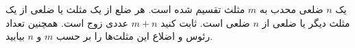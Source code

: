 \EXERCISE
یک 
$n$
ضلعی محدب به
$m$
مثلث تقسیم شده است. هر ضلع از یک مثلث یا ضلعی از یک مثلث دیگر یا ضلعی از
$n$
ضلعی است. ثابت کنید
$m + n$
عددی زوج است. همچنین تعداد رئوس و اضلاع این مثلث‌ها را بر حسب
$m$
و
$n$
بیابید.